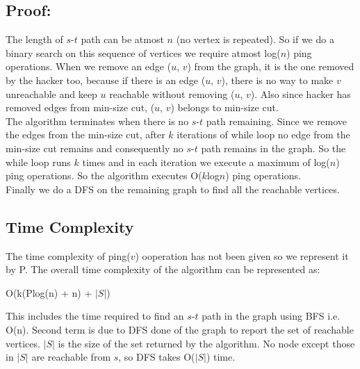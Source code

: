 \documentclass[a4paper,12pt]{article}
\begin{document}
\subsection{Proof:}
The length of $s$-$t$ path can be atmost $n$ (no vertex is repeated). So if we do a binary search on 
this sequence of vertices we require atmost log($n$) ping operations. When we remove an edge ($u$, $v$) from the graph,
it is the one removed by the hacker too, because if there is an edge ($u$, $v$), there is no way to make $v$ unreachable 
and keep $u$ reachable without removing ($u$, $v$). Also since hacker has removed edges from min-size cut, ($u$, $v$) belongs
to min-size cut.\\
The algorithm terminates when there is no $s$-$t$ path remaining. Since we remove the edges from the min-size cut,
after $k$ iterations of while loop no edge from the min-size cut remains and consequently no $s$-$t$ path remains in the graph.
So the while loop runs $k$ times and in each iteration we execute a maximum of log($n$) ping operations.
So the algorithm executes O($k$log$n$) ping operations.\\
Finally we do a DFS on the remaining graph to find all the reachable vertices.
\subsection{Time Complexity}
The time complexity of ping($v$) ooperation has not been given so we represent it by P. The overall
time complexity of the algorithm can be represented as:
\begin{center}
 O(k(Plog(n) + n) + $|S|$)
\end{center}
This includes the time required to find an $s$-$t$ path in the graph using BFS i.e. O(n).
Second term is due to DFS done of the graph to report the set of reachable vertices. $|S|$ is the size
of the set returned by the algorithm. No node except those in $|S|$ are reachable from $s$, so DFS takes
O($|S|$) time.
\end{document}
